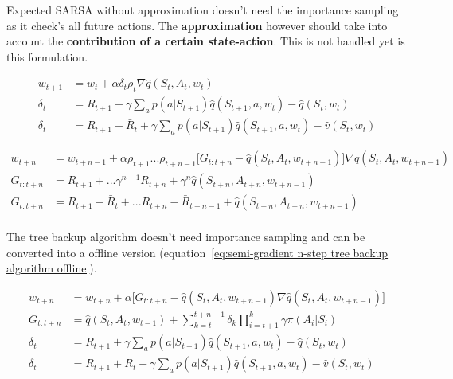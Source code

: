 Expected SARSA without approximation doesn't need the importance sampling as it check's all future actions. The \textbf{approximation} however should take into account the \textbf{contribution of a certain state-action}. This is not handled yet is this formulation.

\begin{equation}
\begin{split}
w_{t+1} & = w_t + \alpha \delta_t \rho_t \nabla \hat{q}(S_t, A_t, w_t) \\
\delta_t & = R_{t+1} + \gamma \sum_{a} p(a|S_{t+1})\hat{q}(S_{t+1}, a, w_t) - \hat{q}(S_t, w_t) \\
\delta_t & = R_{t+1} + \bar{R}_t + \gamma \sum_{a} p(a|S_{t+1})\hat{q}(S_{t+1}, a, w_t)  - \hat{v}(S_t, w_t) 
\end{split}
\label{eq:semi-gradient expected sarsa off-policy action-value update}
\end{equation}


\begin{equation}
\begin{split}
w_{t+n} & = w_{t+n-1} + \alpha \rho_{t+1} ... \rho_{t+n-1}\Big[ G_{t:t+n}-\hat{q}(S_t, A_t, w_{t+n-1}) \Big] \nabla \hat{q}(S_t, A_t, w_{t+n-1})\\
G_{t:t+n} & = R_{t+1} + ... \gamma^{n-1}R_{t+n} + \gamma^n \hat{q}(S_{t+n}, A_{t+n}, w_{t+n-1}) \\
G_{t:t+n} & = R_{t+1} - \bar{R}_{t} + ... R_{t+n} - \bar{R}_{t+n-1} +  \hat{q}(S_{t+n}, A_{t+n}, w_{t+n-1}) \\
\end{split}
\label{eq:n-step SARSA semi-gradient}
\end{equation}

The tree backup algorithm doesn't need importance sampling and can be converted into a offline version (equation~\ref{eq:semi-gradient n-step tree backup algorithm offline}).

\begin{equation}
\begin{split}
w_{t+n} & = w_{t+n} + \alpha \Big[ G_{t:t+n} - \hat{q}(S_t, A_t, w_{t+n-1}) \nabla \hat{q}(S_t, A_t, w_{t+n-1}) \Big] \\
G_{t:t+n} & = \hat{q}(S_t, A_t, w_{t-1}) + \sum_{k=t}^{t+n-1} \delta_k \prod_{i=t+1}^{k}\gamma\pi(A_i|S_i) \\
\delta_t & = R_{t+1} + \gamma \sum_{a} p(a|S_{t+1})\hat{q}(S_{t+1}, a, w_t) - \hat{q}(S_t, w_t) \\
\delta_t & = R_{t+1} + \bar{R}_t + \gamma \sum_{a} p(a|S_{t+1})\hat{q}(S_{t+1}, a, w_t)  - \hat{v}(S_t, w_t) \\
\end{split}
\label{eq:semi-gradient n-step tree backup algorithm offline}
\end{equation}

